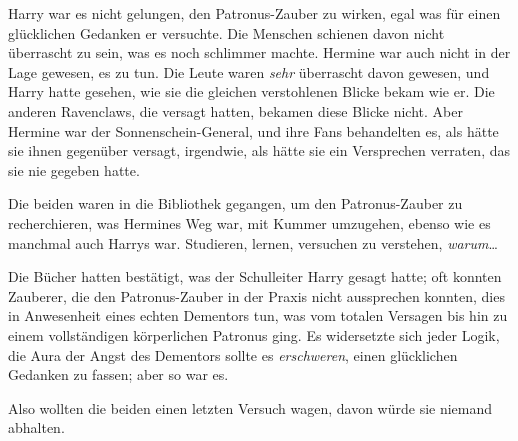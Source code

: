 Harry war es nicht gelungen, den Patronus-Zauber zu wirken, egal was für einen glücklichen Gedanken er versuchte. Die Menschen schienen davon nicht überrascht zu sein, was es noch schlimmer machte. Hermine war auch nicht in der Lage gewesen, es zu tun. Die Leute waren \emph{sehr} überrascht davon gewesen, und Harry hatte gesehen, wie sie die gleichen verstohlenen Blicke bekam wie er. Die anderen Ravenclaws, die versagt hatten, bekamen diese Blicke nicht. Aber Hermine war der Sonnenschein-General, und ihre Fans behandelten es, als hätte sie ihnen gegenüber versagt, irgendwie, als hätte sie ein Versprechen verraten, das sie nie gegeben hatte.

Die beiden waren in die Bibliothek gegangen, um den Patronus-Zauber zu recherchieren, was Hermines Weg war, mit Kummer umzugehen, ebenso wie es manchmal auch Harrys war. Studieren, lernen, versuchen zu verstehen, \emph{warum}…

Die Bücher hatten bestätigt, was der Schulleiter Harry gesagt hatte; oft konnten Zauberer, die den Patronus-Zauber in der Praxis nicht aussprechen konnten, dies in Anwesenheit eines echten Dementors tun, was vom totalen Versagen bis hin zu einem vollständigen körperlichen Patronus ging. Es widersetzte sich jeder Logik, die Aura der Angst des Dementors sollte es \emph{erschweren}, einen glücklichen Gedanken zu fassen; aber so war es.

Also wollten die beiden einen letzten Versuch wagen, davon würde sie niemand abhalten.

